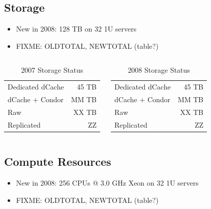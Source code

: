 \documentclass{beamer}
\begin{document}
\subsection{Storage}
\begin{frame}
\begin{itemize}
    \item New in 2008: 128 TB on 32 1U servers
    \item FIXME: OLDTOTAL, NEWTOTAL (table?)
\end{itemize}

\begin{columns}
\column{2.5in}
\begin{table}
    \begin{tabular}{lr}
        \toprule
        Dedicated dCache & 45 TB \\
        dCache + Condor & MM TB \\
        \midrule
        Raw & XX TB \\
        Replicated & ZZ \\
        \bottomrule
    \end{tabular}
    \caption{2007 Storage Status}
    \label{2007_storage_status}
\end{table}

\column{2.5in}
\begin{table}
    \begin{tabular}{lr}
        \toprule
        Dedicated dCache & 45 TB \\
        dCache + Condor & MM TB \\
        \midrule
        Raw & XX TB \\
        Replicated & ZZ \\
        \bottomrule
    \end{tabular}
    \caption{2008 Storage Status}
    \label{2008_storage_status}
\end{table}

\end{columns}
\end{frame}

\subsection{Compute Resources}
\begin{frame}
\begin{itemize}
    \item New in 2008: 256 CPUs @ 3.0 GHz Xeon on 32 1U servers
    \item FIXME: OLDTOTAL, NEWTOTAL (table?)
\end{itemize}
\end{frame}
\end{document}

